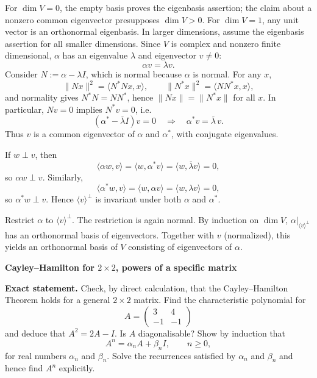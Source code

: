 \begin{solution}
For $\dim V=0$, the empty basis proves the eigenbasis assertion; the claim about a
nonzero common eigenvector presupposes $\dim V>0$. For $\dim V=1$, any unit vector is
an orthonormal eigenbasis. In larger dimensions, assume the eigenbasis assertion
for all smaller dimensions. Since $V$ is complex and nonzero finite dimensional,
$\alpha$ has an eigenvalue $\lambda$ and eigenvector $v\neq 0$:
\[
\alpha v=\lambda v.
\]
Consider $N:=\alpha-\lambda I$, which is normal because $\alpha$ is normal.
For any $x$,
\[
\|Nx\|^2=\langle N^*Nx,x\rangle,\qquad \|N^*x\|^2=\langle NN^*x,x\rangle,
\]
and normality gives $N^*N=NN^*$, hence $\|Nx\|=\|N^*x\|$ for all $x$.
In particular, $Nv=0$ implies $N^*v=0$, i.e.
\[
(\alpha^*-\overline{\lambda}I)v=0 \quad\Rightarrow\quad \alpha^*v=\overline{\lambda}\,v.
\]
Thus $v$ is a common eigenvector of $\alpha$ and $\alpha^*$, with conjugate eigenvalues.

If $w\perp v$, then
\[
\langle \alpha w,v\rangle=\langle w,\alpha^*v\rangle=\langle w,\overline{\lambda}v\rangle=0,
\]
so $\alpha w\perp v$. Similarly,
\[
\langle \alpha^* w,v\rangle=\langle w,\alpha v\rangle=\langle w,\lambda v\rangle=0,
\]
so $\alpha^*w\perp v$. Hence $\langle v\rangle^\perp$ is invariant under both $\alpha$ and $\alpha^*$.

Restrict $\alpha$ to $\langle v\rangle^\perp$. The restriction is again normal.
By induction on $\dim V$, $\alpha|_{\langle v\rangle^\perp}$ has an orthonormal basis of eigenvectors.
Together with $v$ (normalized), this yields an orthonormal basis of $V$ consisting of eigenvectors of $\alpha$.
\end{solution}

\begin{problem}[CP-I-0111]
\label{prob:cp-i-0111}
\textbf{Cayley--Hamilton for $2\times 2$, powers of a specific matrix}

\textbf{Exact statement.}
\hspace*{1.5em}Check, by direct calculation, that the Cayley--Hamilton Theorem holds for a general $2\times 2$ matrix.
Find the characteristic polynomial for
\[
A=\begin{pmatrix}3&4\\-1&-1\end{pmatrix}
\]
and deduce that $A^2=2A-I$. Is $A$ diagonalisable?
Show by induction that
\[
A^n=\alpha_n A+\beta_n I,\qquad n\ge 0,
\]
for real numbers $\alpha_n$ and $\beta_n$.
Solve the recurrences satisfied by $\alpha_n$ and $\beta_n$ and hence find $A^n$ explicitly.

\end{problem}

